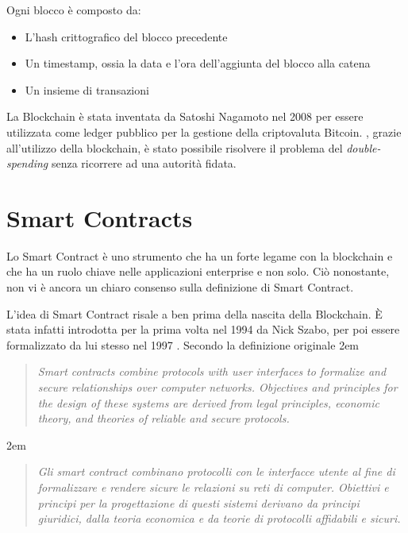 Ogni blocco è composto da:
\begin{itemize}
	\item L'hash crittografico del blocco precedente
	\item Un timestamp, ossia la data e l'ora dell'aggiunta del blocco alla catena
	\item Un insieme di transazioni
\end{itemize}
La Blockchain è stata inventata da Satoshi Nagamoto nel 2008 per essere utilizzata
come ledger pubblico per la gestione della criptovaluta Bitcoin. ,
grazie all'utilizzo della blockchain, è stato possibile risolvere il problema
del \textit{double-spending} senza ricorrere ad una autorità fidata.


\section{Smart Contracts}
Lo Smart Contract è uno strumento che ha un forte legame con la blockchain e che ha un ruolo chiave
nelle applicazioni enterprise e non solo.
Ciò nonostante, non vi è ancora un chiaro consenso sulla definizione di Smart Contract.

L'idea di Smart Contract risale a ben prima della nascita della Blockchain. È stata infatti introdotta
per la prima volta nel 1994 da Nick Szabo, per poi
essere formalizzato da lui stesso nel 1997 \cite{szabo-smart-contracts}.
Secondo la definizione originale
\begingroup
\advance\leftmargini 2em
\begin{quote}
	{
		{\em Smart contracts combine protocols with user interfaces to formalize
				and secure relationships over computer networks.
				Objectives and principles for the design of these systems
				are derived from legal principles, economic theory,
				and theories of reliable and secure protocols.}
	}
\end{quote}
\endgroup
\begingroup
\advance\leftmargini 2em
\begin{quote}
	{
		{\em Gli smart contract combinano protocolli con le interfacce utente
				al fine di formalizzare e rendere sicure
				le relazioni su reti di computer.
				Obiettivi e principi per la progettazione di questi sistemi
				derivano da principi giuridici, dalla teoria economica
				e da teorie di protocolli affidabili e sicuri.}
	}
\end{quote}
\endgroup


